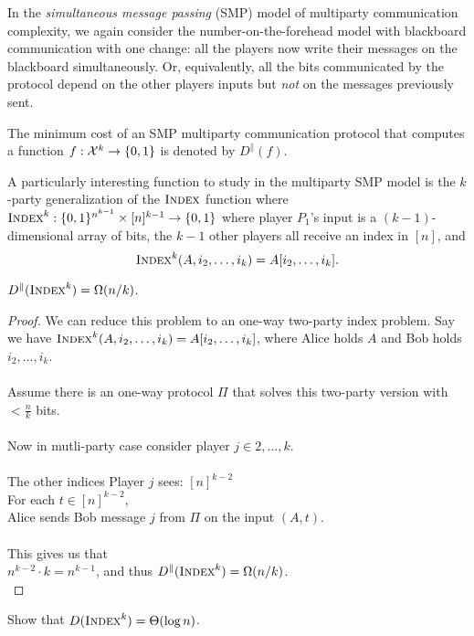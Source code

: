 In the \emph{simultaneous message passing} (SMP) model of multiparty communication complexity, we again consider the number-on-the-forehead model with blackboard communication with one change: all the players now write their messages on the blackboard simultaneously. Or, equivalently, all the bits communicated by the protocol depend on the other players inputs but \emph{not} on the messages previously sent.

The minimum cost of an SMP multiparty communication protocol that computes a function $f : \mathcal{X}^k \to \{0,1\}$ is denoted by $D^\parallel(f)$.

A particularly interesting function to study in the multiparty SMP model is the $k$-party generalization of the $\textsc{Index}$ function where $\textsc{Index}^k : \{0,1\}^{n^{k-1}} \times [n]^{k-1} \to \{0,1\}$ where player $P_1$'s input is a $(k-1)$-dimensional array of bits, the $k-1$ other players all receive an index in $[n]$, and
\[
\textsc{Index}^k(A,i_2,\ldots,i_k) = A[i_2,\ldots,i_k].
\]

\begin{theorem}
	$D^\parallel(\textsc{Index}^k) = \Omega(n/k)$.
\end{theorem}

\begin{proof}
	We can reduce this problem to an one-way two-party index problem. Say we have $\textsc{Index}^k(A,i_2,\ldots,i_k) = A[i_2,\ldots,i_k]$, where Alice holds $A$ and Bob holds ${i_2,\ldots,i_k}$.\\ 
	\\
	Assume there is an one-way protocol $\Pi$ that solves this two-party version with $<\frac{n}{k}$ bits.\\ 
	\\
	Now in mutli-party case consider player $j\in {2,...,k}$.\\
	\\
	The other indices Player $j$ sees: $[n]^{k-2}$\\
	For each $t\in [n]^{k-2}$,\\
	Alice sends Bob message $j$ from $\Pi$ on the input $(A,t)$.\\
	\\
	This gives us that \\
	$n^{k-2}\cdot k=n^{k-1}$, and thus $D^\parallel(\textsc{Index}^k) = \Omega(n/k)$.\\
\end{proof}

\exercises

\begin{exercise}
	Show that $D(\textsc{Index}^k) = \Theta(\log n)$.
\end{exercise}



